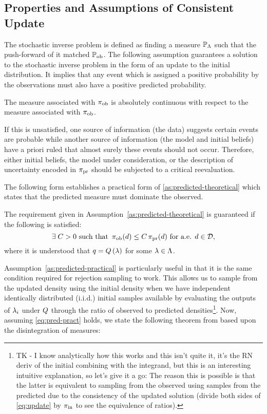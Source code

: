 \subsection{Properties and Assumptions of Consistent Update}\label{sec:properties}

The stochastic inverse problem is defined as finding a measure $\mathbb{P}_{\Lambda}$ such that the push-forward of it matched $\operatorname*{\mathbb{P}_{ob}}$.
The following assumption guarantees a solution to the stochastic inverse problem in the form of an update to the initial distribution.
It implies that any event which is assigned a positive probability by the observations must also have a positive predicted probability.

\begin{assumption}\label{as:predicted-theoretical}
  The measure associated with $\operatorname*{\pi_{ob}}$ is absolutely continuous with respect to the measure associated with $\operatorname*{\pi_{ob}}$.
\end{assumption}

If this is unsatisfied, one source of information (the data) suggests certain events are probable while another source of information (the model and initial beliefs) have a priori ruled that almost surely these events should not occur.
Therefore, either initial beliefs, the model under consideration, or the description of uncertainty encoded in $\operatorname*{\pi_{pr}}$ should be subjected to a critical reevaluation.

The following form establishes a practical form of \ref{as:predicted-theoretical} which states that the predicted measure must dominate the observed.
\begin{assumption}\label{as:predicted-practical}
The requirement given in Assumption~\ref{as:predicted-theoretical} is guaranteed if the following is satisfied:
\begin{equation}\label{eq:pred-pract}
  \exists \; C>0 \text{ such that } \operatorname*{\pi_{ob}} (d) \leq C \operatorname*{\pi_{pr}}(d) \text{ for a.e. } d\in \mathcal{D},
\end{equation}
where it is understood that $q = Q\left ( \lambda \right )$ for some $\lambda \in {\Lambda}$.
\end{assumption}

Assumption~\ref{as:predicted-practical} is particularly useful in that it is the same condition required for rejection sampling to work.
This allows us to sample from the updated density using the initial density when we have independent identically distributed (i.i.d.) initial samples available by evaluating the outputs of $\lambda_i$ under $Q$ through the ratio of observed to predicted densities\footnote{ TK - I know analytically how this works and this isn't quite it, it's the RN deriv of the initial combining with the integrand, but this is an interesting intuitive explanation, so let's give it a go: The reason this is possible is that the latter is equivalent to sampling from the observed using samples from the predicted due to the consistency of the updated solution (divide both sides of \eqref{eq:update} by $\operatorname*{\pi_{in}}$ to see the equivalence of ratios).}.
Now, assuming \eqref{eq:pred-pract} holds, we state the following theorem from \cite{BJW18} based upon the disintegration of measures:


